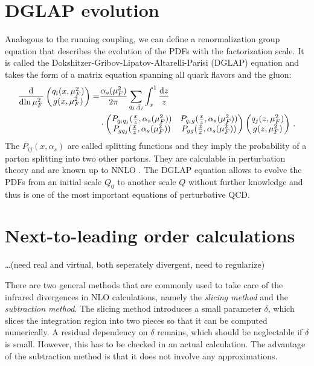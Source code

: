 \section{DGLAP evolution}
Analogous to the running coupling, we can define a renormalization group equation that describes the evolution of the PDFs with the factorization scale.
It is called the Dokshitzer-Gribov-Lipatov-Altarelli-Parisi (DGLAP) equation \cite{dglap1,dglap2,dglap3} and takes the form of a matrix equation spanning all quark flavors and the gluon:
%
\begin{align}
	\dod{}{\ln{\mu_F^2}} \begin{pmatrix} q_i(x,\mu_F^2) \\ g(x,\mu_F^2) \end{pmatrix} = &\frac{\alpha_s(\mu_F^2)}{2 \pi} \sum_{q_j,\bar q_j} \int_x^1 \frac{\dif z}{z} \nonumber \\
	&\cdot \begin{pmatrix}
		P_{q_i q_j}(\frac{x}{z},\alpha_s(\mu_F^2))	&	P_{q_i g}(\frac{x}{z},\alpha_s(\mu_F^2)) \\
		P_{g q_j}(\frac{x}{z},\alpha_s(\mu_F^2))	&	P_{gg}(\frac{x}{z},\alpha_s(\mu_F^2))
	\end{pmatrix}
	\begin{pmatrix} q_j(z,\mu_F^2) \\ g(z,\mu_F^2) \end{pmatrix} \, .
	\label{eq:dglap}
\end{align}
%
The $P_{i j}(x,\alpha_s)$ are called splitting functions and they imply the probability of a parton splitting into two other partons.
They are calculable in perturbation theory and are known up to NNLO \cite{splittingkernel1,splittingkernel2}.
The DGLAP equation allows to evolve the PDFs from an initial scale $Q_0$ to another scale $Q$ without further knowledge and thus is one of the most important equations of perturbative QCD.
%
\section{Next-to-leading order calculations}
\label{sec:nlo_calculations}
\ldots(need real and virtual, both seperately divergent, need to regularize)


There are two general methods that are commonly used to take care of the infrared divergences in NLO calculations, namely the \textit{slicing method} and the \textit{subtraction method}.
The slicing method introduces a small parameter $\delta$, which slices the integration region into two pieces so that it can be computed numerically.
A residual dependency on $\delta$ remains, which should be neglectable if $\delta$ is small.
However, this has to be checked in an actual calculation.
The advantage of the subtraction method is that it does not involve any approximations.

